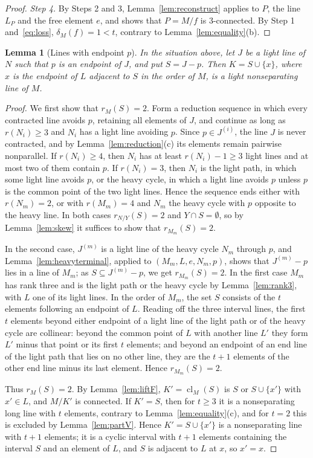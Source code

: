 \documentclass[11pt]{amsart}
\newtheorem{lemma}[theorem]{Lemma}
\theoremstyle{definition}
\theoremstyle{remark}
\numberwithin{equation}{section}
\newcommand{\cl}{\operatorname{cl}}
\begin{document}
\begin{proof}
\emph{Step 4.} By Steps 2 and 3, Lemma~\ref{lem:reconstruct} applies to $P$, the line $L_P$ and the free element $e$, and shows that $P=M/f$ is $3$-connected. By Step 1 and~\eqref{eq:loss}, $\delta_M(f)=1<t$, contrary to Lemma~\ref{lem:equality}(b).
\end{proof}

\begin{lemma}[Lines with endpoint $p$]\label{lem:endpointlift}
In the situation above, let $J$ be a light line of $N$ such that $p$ is an endpoint of $J$, and put $S=J-p$. Then $K=S\cup\{x\}$, where $x$ is the endpoint of $L$ adjacent to $S$ in the order of $M$, is a light nonseparating line of $M$.
\end{lemma}

\begin{proof}
We first show that $r_M(S)=2$. Form a reduction sequence in which every contracted line avoids $p$, retaining all elements of $J$, and continue as long as $r(N_i)\ge3$ and $N_i$ has a light line avoiding $p$. Since $p\in J^{(i)}$, the line $J$ is never contracted, and by Lemma~\ref{lem:reduction}(c) its elements remain pairwise nonparallel. If $r(N_i)\ge4$, then $N_i$ has at least $r(N_i)-1\ge3$ light lines and at most two of them contain $p$. If $r(N_i)=3$, then $N_i$ is the light path, in which some light line avoids $p$, or the heavy cycle, in which a light line avoids $p$ unless $p$ is the common point of the two light lines. Hence the sequence ends either with $r(N_m)=2$, or with $r(M_m)=4$ and $N_m$ the heavy cycle with $p$ opposite to the heavy line. In both cases $r_{N/Y}(S)=2$ and $Y\cap S=\emptyset$, so by Lemma~\ref{lem:skew} it suffices to show that $r_{M_m}(S)=2$.

In the second case, $J^{(m)}$ is a light line of the heavy cycle $N_m$ through $p$, and Lemma~\ref{lem:heavyterminal}, applied to $(M_m,L,e,N_m,p)$, shows that $J^{(m)}-p$ lies in a line of $M_m$; as $S\subseteq J^{(m)}-p$, we get $r_{M_m}(S)=2$. In the first case $M_m$ has rank three and is the light path or the heavy cycle by Lemma~\ref{lem:rank3}, with $L$ one of its light lines. In the order of $M_m$, the set $S$ consists of the $t$ elements following an endpoint of $L$. Reading off the three interval lines, the first $t$ elements beyond either endpoint of a light line of the light path or of the heavy cycle are collinear: beyond the common point of $L$ with another line $L'$ they form $L'$ minus that point or its first $t$ elements; and beyond an endpoint of an end line of the light path that lies on no other line, they are the $t+1$ elements of the other end line minus its last element. Hence $r_{M_m}(S)=2$.

Thus $r_M(S)=2$. By Lemma~\ref{lem:liftF}, $K'=\cl_M(S)$ is $S$ or $S\cup\{x'\}$ with $x'\in L$, and $M/K'$ is connected. If $K'=S$, then for $t\ge3$ it is a nonseparating long line with $t$ elements, contrary to Lemma~\ref{lem:equality}(c), and for $t=2$ this is excluded by Lemma~\ref{lem:partV}. Hence $K'=S\cup\{x'\}$ is a nonseparating line with $t+1$ elements; it is a cyclic interval with $t+1$ elements containing the interval $S$ and an element of $L$, and $S$ is adjacent to $L$ at $x$, so $x'=x$.
\end{proof}
\end{document}
